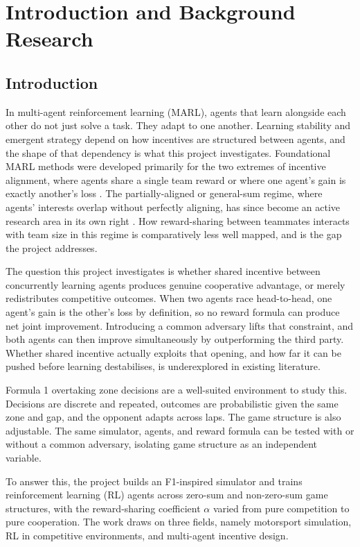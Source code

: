 \chapter{Introduction and Background Research}
\label{chapter1}

\section{Introduction}

In multi-agent reinforcement learning (MARL), agents that learn alongside each other do not just solve a task. They adapt to one another. Learning stability and emergent strategy depend on how incentives are structured between agents, and the shape of that dependency is what this project investigates. Foundational MARL methods were developed primarily for the two extremes of incentive alignment, where agents share a single team reward or where one agent's gain is exactly another's loss \citep{busoniu2008survey}. The partially-aligned or general-sum regime, where agents' interests overlap without perfectly aligning, has since become an active research area in its own right \citep{leibo2017multiagent, hughes2018inequity}. How reward-sharing between teammates interacts with team size in this regime is comparatively less well mapped, and is the gap the project addresses.

The question this project investigates is whether shared incentive between concurrently learning agents produces genuine cooperative advantage, or merely redistributes competitive outcomes. When two agents race head-to-head, one agent's gain is the other's loss by definition, so no reward formula can produce net joint improvement. Introducing a common adversary lifts that constraint, and both agents can then improve simultaneously by outperforming the third party. Whether shared incentive actually exploits that opening, and how far it can be pushed before learning destabilises, is underexplored in existing literature.

Formula 1 overtaking zone decisions are a well-suited environment to study this. Decisions are discrete and repeated, outcomes are probabilistic given the same zone and gap, and the opponent adapts across laps. The game structure is also adjustable. The same simulator, agents, and reward formula can be tested with or without a common adversary, isolating game structure as an independent variable.

To answer this, the project builds an F1-inspired simulator and trains reinforcement learning (RL) agents across zero-sum and non-zero-sum game structures, with the reward-sharing coefficient $\alpha$ varied from pure competition to pure cooperation. The work draws on three fields, namely motorsport simulation, RL in competitive environments, and multi-agent incentive design.

